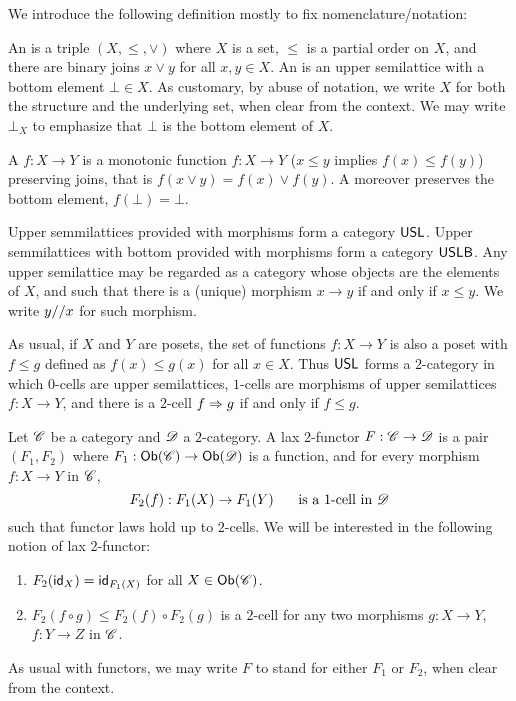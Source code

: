 

We introduce the following definition mostly to fix nomenclature/notation:

\begin{definition}
An  is a triple $(X,\leq,\lor)$
where $X$ is a set, $\leq$ is a partial order on $X$,
and there are binary joins $x \lor y$ for all $x, y \in X$.
An  is an upper semilattice
with a bottom element $\bot \in X$.
As customary, by abuse of notation, we write $X$ for both the structure
and the underlying set, when clear from the context.
We may write $\bot_X$ to emphasize that $\bot$ is the bottom element of $X$.

A  $f : X \to Y$
is a monotonic function $f : X \to Y$
(\ie $x \leq y$ implies $f(x) \leq f(y)$)
preserving joins,
that is $f(x \lor y) = f(x) \lor f(y)$.
A 
moreover preserves the bottom element, \ie $f(\bot) = \bot$.

Upper semmilattices provided with morphisms form a category $\mathsf{USL}$.
Upper semmilattices with bottom provided with morphisms form a category $\mathsf{USLB}$.
Any upper semilattice may be regarded as a category
whose objects are the elements of $X$, and such that there is a (unique) morphism
$x \to y$ if and only if $x \leq y$.
We write $y//x$ for such morphism.

As usual, if $X$ and $Y$ are posets, the set of functions $f : X \to Y$
is also a poset with $f \leq g$ defined as $f(x) \leq g(x)$ for all $x \in X$.
Thus $\mathsf{USL}$ forms a $2$-category
in which $0$-cells are upper semilattices,
$1$-cells are morphisms of upper semilattices $f : X \to Y$, 
and there is a $2$-cell $f \Rightarrow g$ if and only if $f \leq g$.
\end{definition}

\begin{definition}
Let $\mathscr{C}$ be a category and $\mathscr{D}$ a $2$-category.
A lax 2-functor $F : \mathscr{C} \to \mathscr{D}$
is a pair $(F_1,F_2)$ where $F_1 : \mathsf{Ob}(\mathscr{C}) \to \mathsf{Ob}(\mathscr{D})$
is a function, and for every morphism $f : X \to Y$ in $\mathscr{C}$,
\[
  F_2(f) : F_1(X) \to F_1(Y) \hspace{.5cm}\text{ is a 1-cell in $\mathscr{D}$}
\]
such that functor laws hold up to $2$-cells.
We will be interested in the following notion of lax $2$-functor:
\begin{enumerate}
\item $F_2(\mathsf{id}_X) = \mathsf{id}_{F_1(X)}$ for all $X \in \mathsf{Ob}(\mathscr{C})$.
\item $F_2(f \circ g) \leq F_2(f) \circ F_2(g)$ is a $2$-cell
      for any two morphisms $g : X \to Y$, $f : Y \to Z$ in $\mathscr{C}$.
\end{enumerate}
As usual with functors, we may write $F$ to stand for either $F_1$ or $F_2$,
when clear from the context.
\end{definition}

